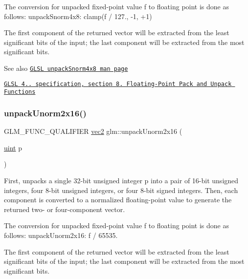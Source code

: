 The conversion for unpacked fixed-\/point value f to floating point is done as follows\+: unpack\+Snorm4x8\+: clamp(f / 127., -\/1, +1)

The first component of the returned vector will be extracted from the least significant bits of the input; the last component will be extracted from the most significant bits.

\begin{DoxySeeAlso}{See also}
\href{http://www.opengl.org/sdk/docs/manglsl/xhtml/unpackSnorm4x8.xml}{\tt G\+L\+SL unpack\+Snorm4x8 man page} 

\href{http://www.opengl.org/registry/doc/GLSLangSpec.4.20.8.pdf}{\tt G\+L\+SL 4.. specification, section 8. Floating-\/\+Point Pack and Unpack Functions} 
\end{DoxySeeAlso}
\mbox{\label{group__core__func__packing_ga11776a74e1885a14e1295d6e917a9ae2}} 
\subsubsection{\texorpdfstring{unpack\+Unorm2x16()}{unpackUnorm2x16()}}
{\footnotesize\ttfamily G\+L\+M\+\_\+\+F\+U\+N\+C\+\_\+\+Q\+U\+A\+L\+I\+F\+I\+ER \hyperlink{group__core__types_gaa1618f51db67eaa145db101d8c8431d8}{vec2} glm\+::unpack\+Unorm2x16 (\begin{DoxyParamCaption}\item[{\hyperlink{group__core__precision_ga4fd29415871152bfb5abd588334147c8}{uint}}]{p }\end{DoxyParamCaption})}

First, unpacks a single 32-\/bit unsigned integer p into a pair of 16-\/bit unsigned integers, four 8-\/bit unsigned integers, or four 8-\/bit signed integers. Then, each component is converted to a normalized floating-\/point value to generate the returned two-\/ or four-\/component vector.

The conversion for unpacked fixed-\/point value f to floating point is done as follows\+: unpack\+Unorm2x16\+: f / 65535.

The first component of the returned vector will be extracted from the least significant bits of the input; the last component will be extracted from the most significant bits.

